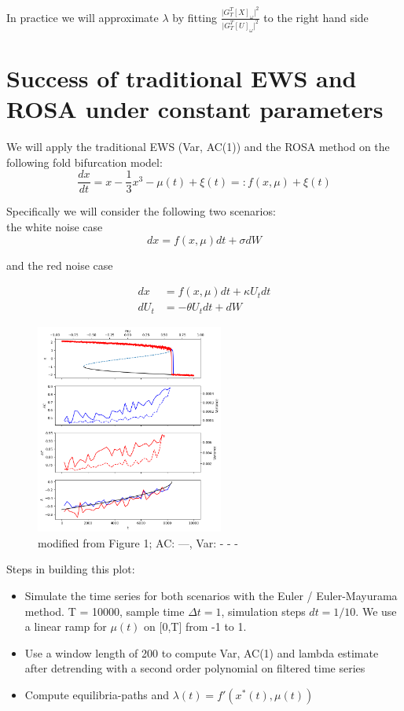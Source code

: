 \documentclass[%
thesis=student,%
coverpage=false,%
titlepage=false,%
headmarks=true, %
german,%
font=libertine, %
math=newpxtx, %
BCOR=5mm,%
coverBCOR=11mm%
]{tumbook}
\begin{document}
In practice we will approximate $\lambda$ by fitting $\frac{\lvert G_{T}^{T}[X]_{\omega} \rvert ^2}{\lvert G_{T}^{T}[U]_{\omega} \rvert ^2}$ to the right hand side



\chapter{Success of traditional EWS and ROSA under constant parameters}

We will apply the traditional EWS (Var, AC(1)) and the ROSA method on the following fold bifurcation model: 
        \[
            \frac{dx}{dt} = x - \frac{1}{3}x^3 - \mu(t) + \xi(t) =: f(x,\mu) + \xi(t)
        \]

Specifically we will consider the following two scenarios: \\
    the white noise case
    \[
    dx = f(x,\mu)dt + \sigma dW
    \]

and the red noise case
    
    \begin{align*}   
    dx & = f(x,\mu)dt + \kappa U_{t}dt \\
    dU_{t} & = -\theta U_{t} dt + dW
    \end{align*}


\begin{figure}
    \centering
    \includegraphics[width=0.55\textwidth]{figures/21_6_fig1_ls_without_conv.png}
    \caption{modified from \cite{Clarke:2023} Figure 1; AC: ---, Var: - - -}
\end{figure}


Steps in building this plot:
    \begin{itemize}
        \item Simulate the time series for both scenarios with the Euler / Euler-Mayurama method. T = 10000, sample time $\Delta t = 1$, simulation steps $dt = 1/10$. We use a linear ramp for $\mu(t)$ on [0,T] from -1 to 1.
    
        \item Use a window length of 200 to compute Var, AC(1) and lambda estimate after detrending with a second order polynomial on filtered time series
        
        \item Compute equilibria-paths and $\lambda (t) = f'(x^{*}(t),\mu(t))$
    \end{itemize}
\end{document}
